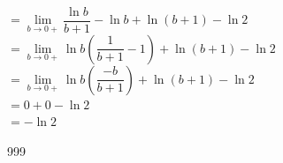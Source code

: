 \documentclass[a4paper]{article}
\begin{document}
$= \lim\limits_{b\to0+} \dfrac{\ln{b}}{b+1} -\ln{b} + \ln\left({b+1}\right)- \ln2 $\\

$= \lim\limits_{b\to0+} \ln{b} \left(\dfrac{1}{b+1}-1\right) +\ln\left({b+1}\right)- \ln2 $\\


$= \lim\limits_{b\to0+} \ln{b} \left(\dfrac{-b}{b+1}\right) +\ln\left({b+1}\right)- \ln2 $\\

$ = 0 + 0 -\ln2$\\

$=-\ln2$\\


\begin{thebibliography}{999}
\end{thebibliography}
\end{document}
